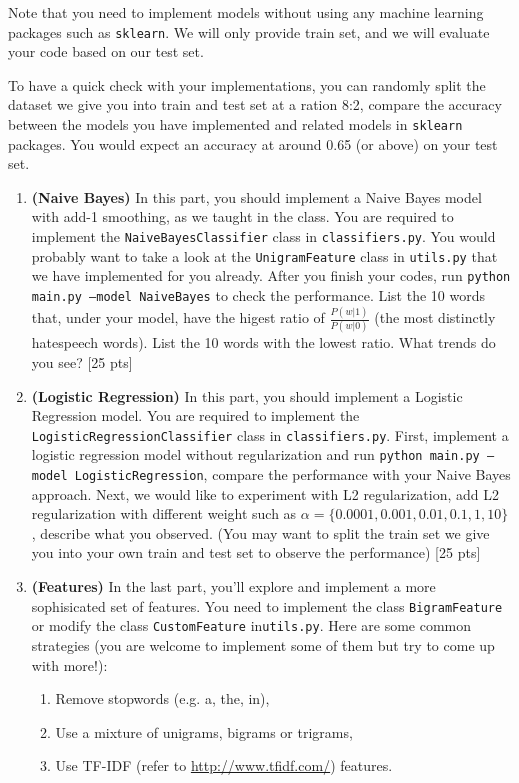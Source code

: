 Note that you need to implement models without using any machine learning packages such as \texttt{sklearn}. We will only provide train set, and we will evaluate your code based on our test set. 

To have a quick check with your implementations, you can randomly split the dataset we give you into train and test set at a ration 8:2, compare the accuracy between the models you have implemented and related models in \texttt{sklearn} packages. You would expect an accuracy at around 0.65 (or above) on your test set. 

\begin{enumerate}

\item  \textbf{(Naive Bayes)} In this part, you should implement a Naive Bayes model with add-1 smoothing, as we
taught in the class. You are required to implement the \texttt{NaiveBayesClassifier} class in \texttt{classifiers.py}. You would probably want to take a look at the \texttt{UnigramFeature} class in \texttt{utils.py} that we have implemented for you already. After you finish your codes, run \texttt{python main.py --model NaiveBayes} to check the performance. List the 10 words that, under your model, have the higest ratio of $\frac{P (w|1)}
{P (w|0)}$ (the most
distinctly hatespeech words). List the 10 words with the lowest ratio. What trends do you see? [25 pts]


\item \textbf{(Logistic Regression)} In this part, you should implement a Logistic Regression model. You are required to implement the \texttt{LogisticRegressionClassifier} class in \texttt{classifiers.py}. First, implement a logistic regression model without regularization and run \texttt{python main.py --model LogisticRegression}, compare the performance with your Naive Bayes approach. Next, we would like to experiment with L2 regularization, add L2 regularization with different weight such as $\alpha = \{0.0001, 0.001, 0.01, 0.1, 1, 10\}$, describe what you observed. (You may want to split the train set we give you into your own train and test set to observe the performance) [25 pts]

\item \textbf{(Features)} In the last part, you’ll explore and implement a more sophisicated set of features. You need
to implement the class \texttt{BigramFeature} or modify the class \texttt{CustomFeature} in\texttt{utils.py}. Here are some common strategies (you are
welcome to implement some of them but try to come up with more!):
\begin{enumerate}
    \item Remove stopwords (e.g. a, the, in),
    \item Use a mixture of unigrams, bigrams or trigrams,
    \item Use TF-IDF (refer to \url{http://www.tfidf.com/}) features.
\end{enumerate}


\end{enumerate}
